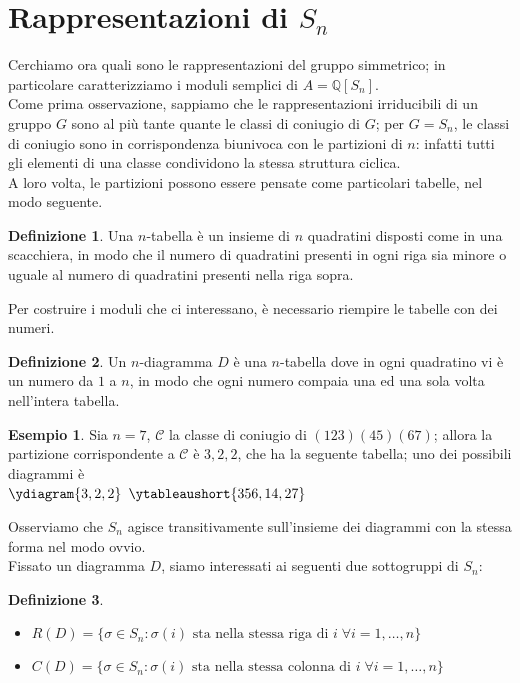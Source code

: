 \documentclass[11pt]{article}
\theoremstyle{plain}
\theoremstyle{definition}
\newtheorem{defn}{Definizione}[section]
\newtheorem{exmp}{Esempio}[section]
\theoremstyle{remark}
\newcommand{\Q}{\mathbb{Q}}
\begin{document}
\newpage
\section{Rappresentazioni di $S_n$}
Cerchiamo ora quali sono le rappresentazioni del gruppo simmetrico; in particolare caratterizziamo i moduli semplici di $A=\Q[S_n]$.\\
Come prima osservazione, sappiamo che le rappresentazioni irriducibili di un gruppo $G$ sono al più tante quante le classi di coniugio di $G$; per $G=S_n$, le classi di coniugio sono in corrispondenza biunivoca con le partizioni di $n$: infatti tutti gli elementi di una classe condividono la stessa struttura ciclica.\\
A loro volta, le partizioni possono essere pensate come particolari tabelle, nel modo seguente.
\begin{defn}
	Una $n$-tabella è un insieme di $n$ quadratini disposti come in una scacchiera, in modo che il numero di quadratini presenti in ogni riga sia minore o uguale al numero di quadratini presenti nella riga sopra.
\end{defn}
Per costruire i moduli che ci interessano, è necessario riempire le tabelle con dei numeri.
\begin{defn}
	Un $n$-diagramma $D$ è una $n$-tabella dove in ogni quadratino vi è un numero da $1$ a $n$, in modo che ogni numero compaia una ed una sola volta nell'intera tabella.
\end{defn}
\begin{exmp}
	Sia $n=7$, $\mathcal{C}$ la classe di coniugio di $(123)(45)(67)$; allora la partizione corrispondente a $\mathcal{C}$ è $3,2,2$, che ha la seguente tabella; uno dei possibili diagrammi è \\ $\ydiagram{3,2,2}$ $\ytableaushort{356,14,27}$
\end{exmp}
Osserviamo che $S_n$ agisce transitivamente sull'insieme dei diagrammi con la stessa forma nel modo ovvio.\\
Fissato un diagramma $D$, siamo interessati ai seguenti due sottogruppi di $S_n$:
\begin{defn}$ $
	\begin{itemize}
		\item $R(D)=\{\sigma\in S_n : \sigma(i) \text{ sta nella stessa riga di } i\;\forall i=1,\dots,n\}$
		\item $C(D)=\{\sigma\in S_n : \sigma(i) \text{ sta nella stessa colonna di } i\;\forall i=1,\dots,n\}$
	\end{itemize}
\end{defn}
\end{document}
